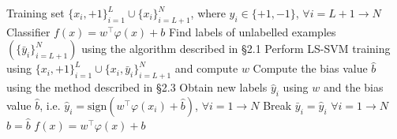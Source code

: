 \documentclass{article}
\begin{document}
\begin{algorithm}[!h]
\renewcommand{\algorithmicrequire}{\textbf{Input:}}
\renewcommand{\algorithmicensure}{\textbf{Output:}}
	\caption{MMC-LS-SVM LPU (called MCLS in the source paper)}
	\begin{algorithmic}[1]
	    \REQUIRE
	    Training set $\{x_{i},+1\}_{i=1}^{L}\cup\{x_{i}\}_{i=L+1}^{N}$,
	    where $y_{i}\in\{+1,-1\}$, $\forall i=L+1\longrightarrow N$
	    \ENSURE
	    Classifier $f(x)=w^{\top}\varphi(x)+b$
	    \STATE Find labels of unlabelled examples $\left(\{\bar{y}_{i}\}_{i=L+1}^{N}\right)$
	    using the algorithm described in \S2.1 %
	    \STATE Perform LS-SVM training using
	    $\{x_{i},+1\}_{i=1}^{L}\cup\{x_{i},\bar{y}_{i}\}_{i=L+1}^{N}$ and compute $w$ %
	    \STATE Compute the bias value $\hat{b}$ using the method described in \S2.3 %
	    \STATE Obtain new labels $\hat{y}_{i}$ using $w$ and the bias value $\hat{b}$,
	    i.e. $\hat{y}_{i}=\mathrm{sign}\!\left(w^{\top}\varphi(x_{i})+\hat{b}\right)$,
	    $\forall i=1\longrightarrow N$
	    \STATE Break %
	    \ELSE
	    \STATE $\bar{y}_{i}=\hat{y}_{i}$ $\forall i=1\longrightarrow N$
	    \ENDIF
	    \ENDWHILE
	    \STATE $b=\hat{b}$
		\RETURN $f(x)=w^{\top}\varphi(x)+b$
	\end{algorithmic}
\end{algorithm}
\end{document}
